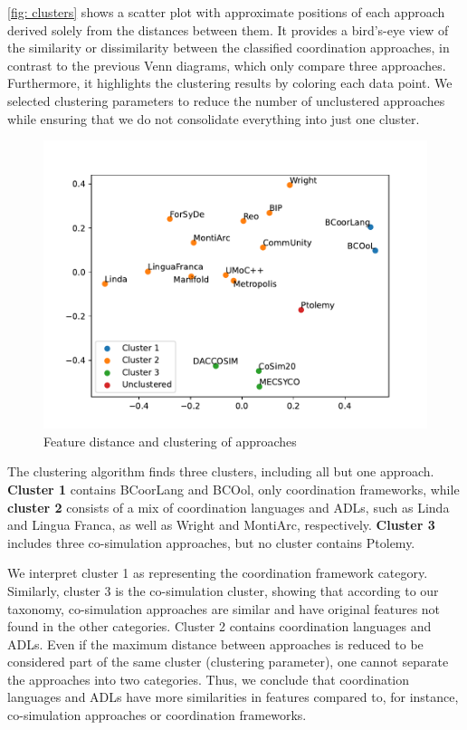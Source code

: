 \documentclass[runningheads]{llncs}
\begin{document}
\autoref{fig: clusters} shows a scatter plot with approximate positions of each approach derived solely from the distances between them.
It provides a bird's-eye view of the similarity or dissimilarity between the classified coordination approaches, in contrast to the previous Venn diagrams, which only compare three approaches.
Furthermore, it highlights the clustering results by coloring each data point.
We selected clustering parameters to reduce the number of unclustered approaches while ensuring that we do not consolidate everything into just one cluster.

\begin{figure}[ht]
	\centering
	\includegraphics[width=1\textwidth]{images/approach_scatter}
	\caption{Feature distance and clustering of approaches}
	\label{fig: clusters}
\end{figure}

The clustering algorithm finds three clusters, including all but one approach.
\textbf{Cluster 1} contains BCoorLang and BCOol, only coordination frameworks, while \textbf{cluster 2} consists of a mix of coordination languages and ADLs, such as Linda and Lingua Franca, as well as Wright and MontiArc, respectively.
\textbf{Cluster 3} includes three co-simulation approaches, but no cluster contains Ptolemy.

We interpret cluster 1 as representing the coordination framework category.
Similarly, cluster 3 is the co-simulation cluster, showing that according to our taxonomy, co-simulation approaches are similar and have original features not found in the other categories.
Cluster 2 contains coordination languages and ADLs.
Even if the maximum distance between approaches is reduced to be considered part of the same cluster (clustering parameter), one cannot separate the approaches into two categories.
Thus, we conclude that coordination languages and ADLs have more similarities in features compared to, for instance, co-simulation approaches or coordination frameworks.
\end{document}
